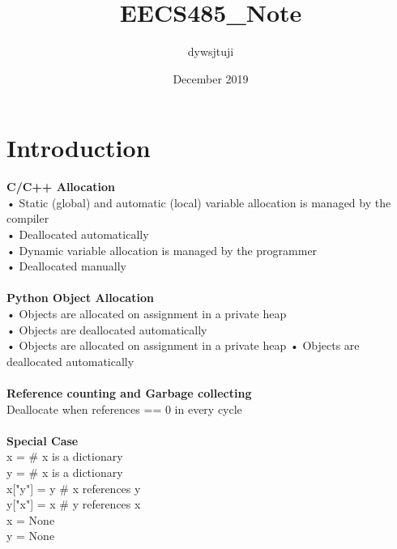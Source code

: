 \documentclass{article}
\title{EECS485_Note}
\author{dywsjtuji }
\date{December 2019}
\begin{document}
\maketitle

\section{Introduction}
\large{\textbf{C/C++ Allocation}}\\
• Static (global) and automatic
(local) variable allocation is
managed by the compiler\\
• Deallocated automatically\\
• Dynamic variable allocation is
managed by the programmer\\
• Deallocated manually\\ \\ 
\large{\textbf{Python Object Allocation}}\\
• Objects are allocated on
assignment in a private heap\\
• Objects are deallocated
automatically\\• Objects are allocated on
assignment in a private heap
• Objects are deallocated
automatically\\ \\ 
\large{\textbf{Reference counting and Garbage collecting}} \\
Deallocate when references  == 0 in every cycle\\ \\ 
\textbf{Special Case}\\
x = {} # x is a dictionary\\
y = {} # x is a dictionary\\
x["y"] = y # x references y\\
y["x"] = x # y references x\\
x = None\\
y = None
\end{document}
